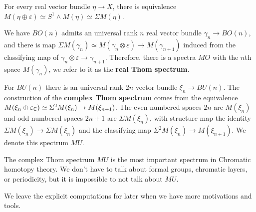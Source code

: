 \begin{lemma}
  For every real vector bundle $\eta\to X$, there is equivalence $M(\eta\oplus \varepsilon)\simeq S^1\wedge M(\eta)\simeq \Sigma M(\eta)$.
\end{lemma}

We have $BO(n)$ admits an universal rank $n$ real vector bundle $\gamma_n\to BO(n)$, and there is map $\Sigma M(\gamma_n)\simeq M(\gamma_n\otimes \varepsilon)\to M(\gamma_{n+1})$ induced from the classifying map of $\gamma_n\otimes \varepsilon\to \gamma_{n+1}$. Therefore, there is a spectra $MO$ with the $n$th space $M(\gamma_n)$, we refer to it as the \textbf{real Thom spectrum}.

For $BU(n)$ there is an universal rank $2n$ vector bundle $\xi_n\to BU(n)$. The construction of the \textbf{complex Thom spectrum} comes from the equivalence $M(\xi_n\oplus \varepsilon_{\mathbb{C}})\simeq \Sigma^2M(\xi_n)\to M(\xi_{n+1})$. The even numbered spaces $2n$ are $M(\xi_n)$ and odd numbered spaces $2n+1$ are $\Sigma M(\xi_n)$, with structure map the identity $\Sigma M(\xi_n)\to \Sigma M(\xi_n)$ and the classifying map $\Sigma^2 M(\xi_n)\to M(\xi_{n+1})$. We denote this spectrum $MU$. 

The complex Thom spectrum $MU$ is the most important spectrum in Chromatic homotopy theory. We don't have to talk about formal groups, chromatic layers, or periodicity, but it is impossible to not talk about $MU$.

We leave the explicit computations for later when we have more motivations and tools.


